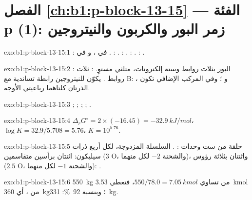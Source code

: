 \section*{الفصل \ref{ch:b1:p-block-13-15} --- الفئة p (1): زمر البور والكربون والنيتروجين}

\begin{solution}{exo:b1:p-block-13-15:1}
:  في ، و في . : .
: . : . : .
\end{solution}

\begin{solution}{exo:b1:p-block-13-15:2}
: البور بثلاث روابط وستة إلكترونات، مثلثي مستوٍ.
: ثلاث روابط . يكوّن  للنيتروجين رابطة تساندية
مع B:  ، و ؛ وفي
المركب الإضافي تكون الذرتان كلتاهما رباعيتي الأوجه.
\end{solution}

\begin{solution}{exo:b1:p-block-13-15:3}
; ;
; ;
.
\end{solution}

\begin{solution}{exo:b1:p-block-13-15:4}
$\Delta_r G^\circ = 2 \times (-16.45) = \qty{-32.9}{kJ/mol}$، $\log K =
32.9/5.708 = 5.76$، $K = 10^{5.76}$.
\end{solution}

\begin{solution}{exo:b1:p-block-13-15:5}
حلقة من ست وحدات : . السلسلة المزدوجة، لكل أربع
ذرات سيليكون: اثنتان برأسين متقاسمين (3 O، والشحنة $-2$ لكل منهما)، واثنتان
بثلاثة رؤوس ($2.5$ O، والشحنة $-1$ لكل منهما): .
\end{solution}

\begin{solution}{exo:b1:p-block-13-15:6}
\qty{550}{kg} من  تساوي $550/78.0 = \qty{7.05}{kmol}$، فتعطي
\qty{3.53}{kmol} من ، أي \qty{360}{kg}؛ وبنسبة \qty{92}{\percent}:
\qty{331}{kg}.
\end{solution}


